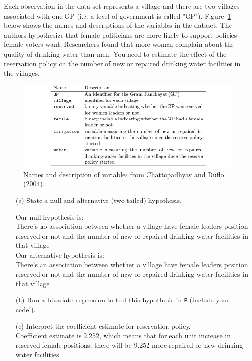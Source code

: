 \documentclass[12pt,letterpaper]{article}
\begin{document}
\noindent Each observation in the data set represents a village and there are two villages associated with one GP (i.e. a level of government is called "GP"). Figure~\ref{fig:women_desc} below shows the names and descriptions of the variables in the dataset. The authors hypothesize that female politicians are more likely to support policies female voters want. Researchers found that more women complain about the quality of drinking water than men. You need to estimate the effect of the reservation policy on the number of new or repaired drinking water facilities in the villages.
\vspace{.5cm}
\begin{figure}[h!]
	\caption{\footnotesize{Names and description of variables from Chattopadhyay and Duflo (2004).}}
	\vspace{.5cm}
	\centering
	\label{fig:women_desc}
	\includegraphics[width=1.1\textwidth]{women_desc.png}
\end{figure}		

\newpage
\begin{enumerate}
	\item [(a)] State a null and alternative (two-tailed) hypothesis. 
	
	Our null hypothesis is:
	\\There's no association between whether a village have female leaders position reserved or not and the number of new or repaired drinking water facilities in that village
	\\Our alternative hypothesis is:
	\\There's an association between whether a village have female leaders position reserved or not and the number of new or repaired drinking water facilities in that village

	\vspace{.5cm}
	\item [(b)] Run a bivariate regression to test this hypothesis in \texttt{R} (include your code!).
	
	\vspace{.5cm}
	\item [(c)] Interpret the coefficient estimate for reservation policy. 
	\vspace{.5cm}
	\\Coefficient estimate is 9.252, which means that for each unit increase in reserved female positions, there will be 9.252 more repaired or new drinking water facilities
	
\end{enumerate}
\end{document}
